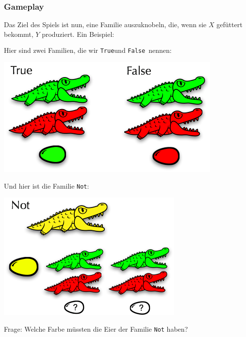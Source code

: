 \documentclass{beamer}
\begin{document}
\begin{frame}
\frametitle{Gameplay}

Das Ziel des Spiels ist nun, eine Familie auszuknobeln, die, wenn sie $X$ gefüttert bekommt, $Y$ produziert. Ein Beispiel:\pause

\begin{multicols}{2}

Hier sind zwei Familien, die wir \glqq \texttt{True}\grqq und \glqq \texttt{False}\grqq\ nennen:

\begin{center}
\includegraphics[scale=0.3]{gameplay_1.png} 
\end{center}

\columnbreak
\pause

Und hier ist die Familie \glqq \texttt{Not}\grqq :

\begin{center}
\includegraphics[scale=0.35]{gameplay_2.png} 
\end{center}

\end{multicols}

Frage: Welche Farbe müssten die Eier der Familie \texttt{Not} haben?

\end{frame}

\end{document}
